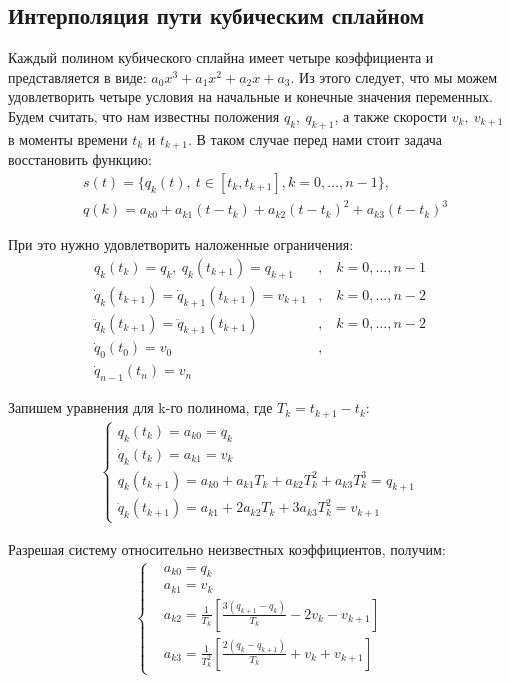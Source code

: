 \subsection{Интерполяция пути кубическим сплайном} \label{subsect2_2_1}
Каждый полином кубического сплайна имеет четыре коэффициента и представляется в виде: $a_{0}x^{3} + a_{1}x^{2} + a_{2}x + a_{3}$. Из этого следует, что мы можем удовлетворить четыре условия на начальные и конечные значения переменных. Будем считать, что нам известны положения $q_{k},\ q_{k+1}$, а также скорости $v_{k},\ v_{k+1}$ в моменты времени $t_{k}$ и $t_{k+1}$. В таком случае перед нами стоит задача восстановить функцию:
\begin{align*}
	&s(t) = \{q_{k}(t),\ t \in [t_{k}, t_{k+1}],	k=0,\dotsc,n-1\},\\
	&q(k) = a_{k0} + a_{k1}(t - t_{k}) + a_{k2}(t - t_{k})^{2} + a_{k3}(t - t_{k})^{3}
\end{align*}

При это нужно удовлетворить наложенные ограничения:
\begin{align*}
	q_{k}(t_{k}) = q_{k},\ q_{k}(t_{k+1}) = q_{k+1}&,				&\	k=0,\dotsc,n-1\\
	\dot{q}_{k}(t_{k+1}) = \dot{q}_{k+1}(t_{k+1}) = v_{k+1}&,		&\	k=0,\dotsc,n-2\\
	\ddot{q}_{k}(t_{k+1}) = \ddot{q}_{k+1}(t_{k+1})&,				&\	k=0,\dotsc,n-2\\
	\dot{q}_{0}(t_{0}) = v_{0}&,\\
	\dot{q}_{n-1}(t_{n}) = v_{n}&
\end{align*}

Запишем уравнения для k-го полинома, где $T_{k} = t_{k+1} - t_{k}$:
\begin{align*}
	\begin{cases}
		q_{k}(t_{k}) = a_{k0} = q_{k}\\
		\dot{q}_{k}(t_{k}) = a_{k1} = v_{k}\\
		q_{k}(t_{k+1}) = a_{k0} + a_{k1}T_{k} + a_{k2}T_{k}^{2} + a_{k3}T_{k}^{3} = q_{k+1}\\
		\dot{q}_{k}(t_{k+1}) = a_{k1}+ 2a_{k2}T_{k} + 3a_{k3}T_{k}^{2} = v_{k+1}
	\end{cases}
\end{align*}

Разрешая систему относительно неизвестных коэффициентов, получим:
\begin{align*}
	\begin{cases}
		&a_{k0} = q_{k}\\
		&a_{k1} = v_{k}\\
		&a_{k2} = \frac{1}{T_{k}}[\frac{3(q_{k+1} - q_{k})}{T_{k}} - 2v_{k} - v_{k+1}]\\
		&a_{k3} = \frac{1}{T_{k}^2}[\frac{2(q_{k} - q_{k+1})}{T_{k}} + v_{k} + v_{k+1}]
	\end{cases}
\end{align*}

